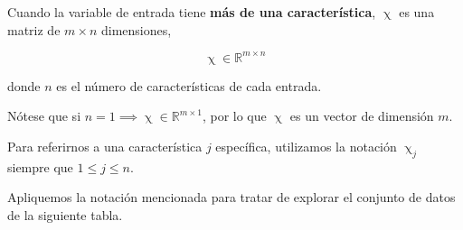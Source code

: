 \documentclass[twoside,twocolumn]{article}
\newcommand{\realset}{\mathbb{R}} %
\begin{document}
          Cuando la variable de entrada tiene \textbf{más de una característica},
          $\upchi$ es una matriz de $m \times n$ dimensiones,
         
          \[
            \upchi \in \realset^{m \times n}
          \]

          donde $n$ es el número de características de cada entrada.

          Nótese que si $n = 1 \implies \upchi \in \realset ^ {m \times 1}$, por lo que 
          $\upchi$ es un vector de dimensión $m$.

          Para referirnos a una característica $j$ específica, utilizamos la notación
          $\upchi_{j}$ siempre que $1 \leq j \leq n$.

          Apliquemos la notación mencionada para tratar de explorar el conjunto de datos
          de la siguiente tabla.

          \begin{table}[h]

            \centering
            \caption{Conjunto de entrenamiento.}
            \label{tabla:m_datos}

          \end{table}
          
\end{document}

